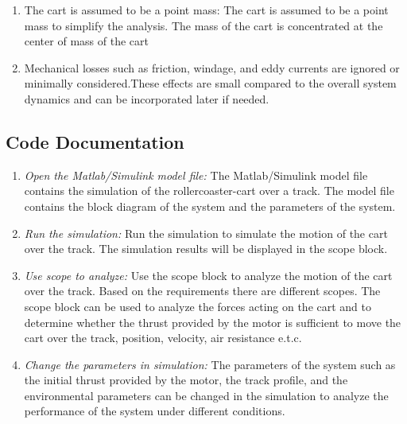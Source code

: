\documentclass{article}
\begin{document}
\begin{itemize}
\begin{enumerate}
        \item The cart is assumed to be a point mass: The cart is assumed to be
            a point mass to simplify the analysis. The mass of the cart is concentrated
            at the center of mass of the cart

        \item Mechanical losses such as friction, windage, and eddy currents are
            ignored or minimally considered.These effects are small compared to the
            overall system dynamics and can be incorporated later if needed.
    \end{enumerate}

    \subsection{Code Documentation}
    \begin{enumerate}
        \item \textit{Open the Matlab/Simulink model file:} The Matlab/Simulink
            model file contains the simulation of the rollercoaster-cart over a
            track. The model file contains the block diagram of the system and the
            parameters of the system.

        \item \textit{Run the simulation:} Run the simulation to simulate the
            motion of the cart over the track. The simulation results will be displayed
            in the scope block.

        \item \textit{Use scope to analyze:} Use the scope block to analyze the
            motion of the cart over the track. Based on the requirements there are
            different scopes. The scope block can be used to analyze the forces
            acting on the cart and to determine whether the thrust provided by
            the motor is sufficient to move the cart over the track, position,
            velocity, air resistance e.t.c.

        \item \textit{Change the parameters in simulation:} The parameters of
            the system such as the initial thrust provided by the motor, the track
            profile, and the environmental parameters can be changed in the
            simulation to analyze the performance of the system under different
            conditions.
    \end{enumerate}


\end{itemize}
\end{document}
